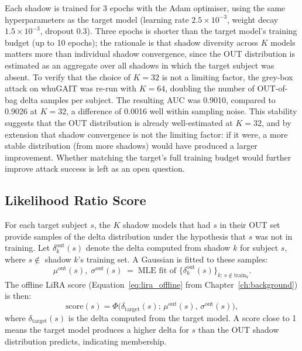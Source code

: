 Each shadow is trained for 3 epochs with the Adam optimiser, using the same hyperparameters as the target model (learning rate $2.5 \times 10^{-3}$, weight decay $1.5 \times 10^{-3}$, dropout 0.3). Three epochs is shorter than the target model's training budget (up to 10 epochs); the rationale is that shadow diversity across $K$ models matters more than individual shadow convergence, since the OUT distribution is estimated as an aggregate over all shadows in which the target subject was absent. To verify that the choice of $K = 32$ is not a limiting factor, the grey-box attack on whuGAIT was re-run with $K = 64$, doubling the number of OUT-of-bag delta samples per subject. The resulting AUC was 0.9010, compared to 0.9026 at $K = 32$, a difference of 0.0016 well within sampling noise. This stability suggests that the OUT distribution is already well-estimated at $K = 32$, and by extension that shadow convergence is not the limiting factor: if it were, a more stable distribution (from more shadows) would have produced a larger improvement. Whether matching the target's full training budget would further improve attack success is left as an open question.

\subsection{Likelihood Ratio Score}
\label{ssec:mia_lr_score}

For each target subject $s$, the $K$ shadow models that had $s$ in their OUT set provide samples of the delta distribution under the hypothesis that $s$ was not in training. Let $\delta^{\text{out}}_k(s)$ denote the delta computed from shadow $k$ for subject $s$, where $s \notin$ shadow $k$'s training set. A Gaussian is fitted to these samples:
\begin{equation}
  \mu^{\text{out}}(s),\; \sigma^{\text{out}}(s)
  \;=\; \text{MLE fit of }
  \bigl\{\delta^{\text{out}}_k(s)\bigr\}_{k:\, s \notin \text{train}_k}.
\end{equation}
The offline LiRA score (Equation~\eqref{eq:lira_offline} from Chapter~\ref{ch:background}) is then:
\begin{equation}
  \text{score}(s)
  = \Phi\!\bigl(\delta_{\text{target}}(s);\,
    \mu^{\text{out}}(s),\, \sigma^{\text{out}}(s)\bigr),
\end{equation}
where $\delta_{\text{target}}(s)$ is the delta computed from the target model. A score close to 1 means the target model produces a higher delta for $s$ than the OUT shadow distribution predicts, indicating membership.

